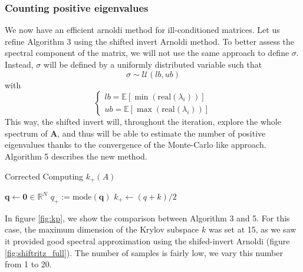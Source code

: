 \documentclass[11pt]{article}
\numberwithin{equation}{section}
\begin{document}
\subsubsection{Counting positive eigenvalues}
We now have an efficient arnoldi method for ill-conditioned matrices. Let us refine Algorithm 3 using the shifted invert Arnoldi method. To better assess the spectral component of the matrix, we will not use the same approach to define $\sigma$. Instead, $\sigma$ will be defined by a uniformly distributed variable such that $$\sigma\sim\mathcal{U}(lb,ub)$$ with 
\begin{equation*}
    \begin{cases}
        lb = \mathbb{E}\left[\min(\text{real}(\lambda_i))\right] \\
        ub = \mathbb{E}\left[\max(\text{real}(\lambda_i))\right]
    \end{cases}
\end{equation*}
This way, the shifted invert will, throughout the iteration, explore the whole spectrum of $\mathbf{A}$, and thus will be able to estimate the number of positive eigenvalues thanks to the convergence of the Monte-Carlo like approach. Algorithm 5 describes the new method.
\begin{algorithm2e}
    \SetAlgoLined
    \caption{Corrected Computing $k_{+}(A)$}
    $\mathbf{q} \gets \mathbf{0}\in\mathbb{R}^{N}$\;
    $q_+ := \text{mode}(\mathbf{q}) $\;
    $k_+\gets (q+k)/2$
\end{algorithm2e}

In figure \ref{fig:kp}, we show the comparison between Algorithm 3 and 5. For this case, the maximum dimension of the Krylov subspace $k$ was set at 15, as we saw it provided good spectral approximation using the shifed-invert Arnoldi (figure \ref{fig:shiftritz_full}). The number of samples is fairly low, we vary this number from 1 to 20. 
\end{document}
